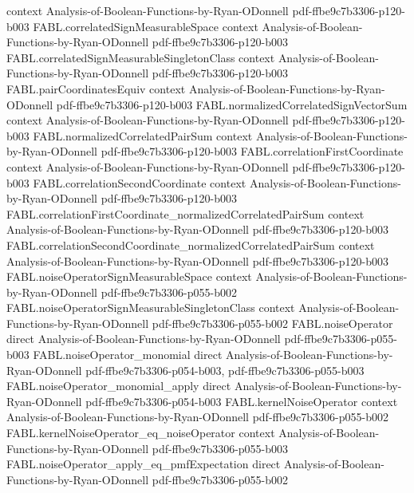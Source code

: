 \begin{theorem}
  {context}
  {Analysis-of-Boolean-Functions-by-Ryan-ODonnell}
  {pdf-ffbe9c7b3306-p120-b003}
\proofstep
  {FABL.correlatedSignMeasurableSpace}
  {context}
  {Analysis-of-Boolean-Functions-by-Ryan-ODonnell}
  {pdf-ffbe9c7b3306-p120-b003}
\proofstep
  {FABL.correlatedSignMeasurableSingletonClass}
  {context}
  {Analysis-of-Boolean-Functions-by-Ryan-ODonnell}
  {pdf-ffbe9c7b3306-p120-b003}
\proofstep
  {FABL.pairCoordinatesEquiv}
  {context}
  {Analysis-of-Boolean-Functions-by-Ryan-ODonnell}
  {pdf-ffbe9c7b3306-p120-b003}
\proofstep
  {FABL.normalizedCorrelatedSignVectorSum}
  {context}
  {Analysis-of-Boolean-Functions-by-Ryan-ODonnell}
  {pdf-ffbe9c7b3306-p120-b003}
\proofstep
  {FABL.normalizedCorrelatedPairSum}
  {context}
  {Analysis-of-Boolean-Functions-by-Ryan-ODonnell}
  {pdf-ffbe9c7b3306-p120-b003}
\proofstep
  {FABL.correlationFirstCoordinate}
  {context}
  {Analysis-of-Boolean-Functions-by-Ryan-ODonnell}
  {pdf-ffbe9c7b3306-p120-b003}
\proofstep
  {FABL.correlationSecondCoordinate}
  {context}
  {Analysis-of-Boolean-Functions-by-Ryan-ODonnell}
  {pdf-ffbe9c7b3306-p120-b003}
\proofstep
  {FABL.correlationFirstCoordinate_normalizedCorrelatedPairSum}
  {context}
  {Analysis-of-Boolean-Functions-by-Ryan-ODonnell}
  {pdf-ffbe9c7b3306-p120-b003}
\proofstep
  {FABL.correlationSecondCoordinate_normalizedCorrelatedPairSum}
  {context}
  {Analysis-of-Boolean-Functions-by-Ryan-ODonnell}
  {pdf-ffbe9c7b3306-p120-b003}
\proofstep
  {FABL.noiseOperatorSignMeasurableSpace}
  {context}
  {Analysis-of-Boolean-Functions-by-Ryan-ODonnell}
  {pdf-ffbe9c7b3306-p055-b002}
\proofstep
  {FABL.noiseOperatorSignMeasurableSingletonClass}
  {context}
  {Analysis-of-Boolean-Functions-by-Ryan-ODonnell}
  {pdf-ffbe9c7b3306-p055-b002}
\proofstep
  {FABL.noiseOperator}
  {direct}
  {Analysis-of-Boolean-Functions-by-Ryan-ODonnell}
  {pdf-ffbe9c7b3306-p055-b003}
\proofstep
  {FABL.noiseOperator_monomial}
  {direct}
  {Analysis-of-Boolean-Functions-by-Ryan-ODonnell}
  {pdf-ffbe9c7b3306-p054-b003,
    pdf-ffbe9c7b3306-p055-b003}
\proofstep
  {FABL.noiseOperator_monomial_apply}
  {direct}
  {Analysis-of-Boolean-Functions-by-Ryan-ODonnell}
  {pdf-ffbe9c7b3306-p054-b003}
\proofstep
  {FABL.kernelNoiseOperator}
  {context}
  {Analysis-of-Boolean-Functions-by-Ryan-ODonnell}
  {pdf-ffbe9c7b3306-p055-b002}
\proofstep
  {FABL.kernelNoiseOperator_eq_noiseOperator}
  {context}
  {Analysis-of-Boolean-Functions-by-Ryan-ODonnell}
  {pdf-ffbe9c7b3306-p055-b003}
\proofstep
  {FABL.noiseOperator_apply_eq_pmfExpectation}
  {direct}
  {Analysis-of-Boolean-Functions-by-Ryan-ODonnell}
  {pdf-ffbe9c7b3306-p055-b002}

\end{theorem}
